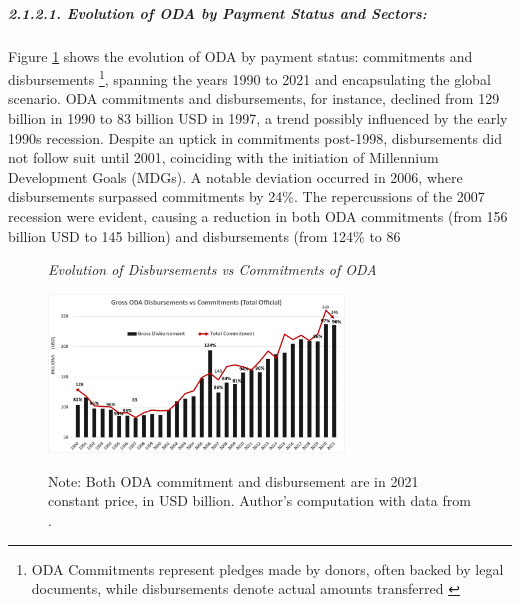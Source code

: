 \paragraph{\quad \quad \textit{2.1.2.1. Evolution of ODA by Payment Status and Sectors:}}
\subparagraph{} Figure \ref{Disbursement Vs Commitment} shows the evolution of ODA by payment status: commitments and disbursements \footnote{ODA Commitments represent pledges made by donors, often backed by legal documents, while disbursements denote actual amounts transferred \parencite{oecd_ODA_Report_2023}}, spanning the years 1990 to 2021 and encapsulating the global scenario. ODA commitments and disbursements, for instance, declined from 129 billion in 1990 to 83 billion USD in 1997, a trend possibly influenced by the early 1990s recession. Despite an uptick in commitments post-1998, disbursements did not follow suit until 2001, coinciding with the initiation of Millennium Development Goals (MDGs). A notable deviation occurred in 2006, where disbursements surpassed commitments by 24\%. The repercussions of the 2007 recession were evident, causing a reduction in both ODA commitments (from 156 billion USD to 145 billion) and disbursements (from 124\% to 86%

\begin{figure}[ht]
\captionsetup{justification=justified,singlelinecheck=false}
\caption{\textit{Evolution of Disbursements vs Commitments of ODA}}
    \centering \includegraphics[width = 0.7\textwidth]{Figures/ODA_Graphs/Dibs_VS_Commit.pdf}
    \label{Disbursement Vs Commitment}
\caption*{\footnotesize{Note: Both ODA commitment and disbursement are in 2021 constant price, in USD billion. Author's computation with data from \textcite{oecd_Data_2023}.}}
\end{figure}

